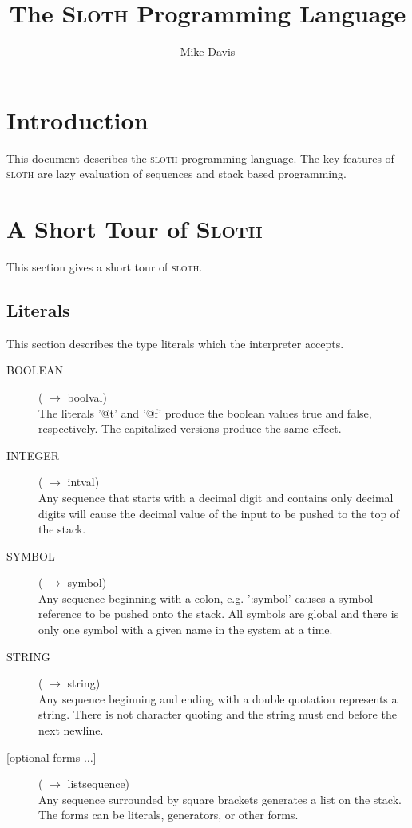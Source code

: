 \documentclass[12pt]{article}
\newcommand{\sloth}{\textsc{sloth}}
\newcommand{\Sloth}{\textsc{Sloth}}
\newcommand{\stackcmd}[3]{\item[{#1}] \hfill ({#2} $\rightarrow{}$ {#3}) \\}
\begin{document}
\title{The \Sloth{} Programming Language}
\author{Mike Davis}
\maketitle


\section*{Introduction}

This document describes the \sloth{} programming language.  The key
features of \sloth{} are lazy evaluation of sequences and stack based
programming. 

\section*{A Short Tour of \Sloth}

This section gives a short tour of \sloth.  

\subsection*{Literals}

This section describes the type literals which the interpreter
accepts.

\begin{description}

\stackcmd{BOOLEAN}{}{boolval} The literals '@t' and '@f' produce the
boolean values true and false, respectively.  The capitalized versions
produce the same effect.

\stackcmd{INTEGER}{}{intval} Any sequence that starts with a
decimal digit and contains only decimal digits will cause the decimal
value of the input to be pushed to the top of the stack. 

\stackcmd{SYMBOL}{}{symbol}  Any sequence beginning with a colon,
e.g. ':symbol' causes a symbol reference to be pushed onto the stack.
All symbols are global and there is only one symbol with a given name
in the system at a time.

\stackcmd{STRING}{}{string}  Any sequence beginning and ending with a
double quotation represents a string.  There is not character quoting
and the string must end before the next newline.

\stackcmd{[optional-forms $\dots$]}{}{list\-sequence}  Any sequence
surrounded by square brackets generates a list on the stack.  The
forms can be literals, generators, or other forms.

\end{description}
\end{document}
